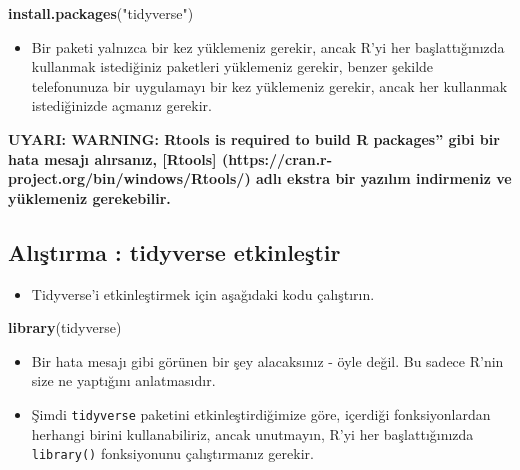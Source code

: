 \documentclass[
  oneside]{book}
\newenvironment{Shaded}{\begin{snugshade}}{\end{snugshade}}
\newcommand{\FunctionTok}[1]{\textcolor[rgb]{0.13,0.29,0.53}{\textbf{#1}}}
\newcommand{\NormalTok}[1]{#1}
\newcommand{\StringTok}[1]{\textcolor[rgb]{0.31,0.60,0.02}{#1}}
\providecommand{\tightlist}{%
  \setlength{\itemsep}{0pt}\setlength{\parskip}{0pt}}
\begin{document}
\begin{Shaded}
\begin{Highlighting}[]
\FunctionTok{install.packages}\NormalTok{(}\StringTok{"tidyverse"}\NormalTok{)}
\end{Highlighting}
\end{Shaded}

\begin{itemize}
\tightlist
\item
  Bir paketi yalnızca bir kez yüklemeniz gerekir, ancak R'yi her başlattığınızda kullanmak istediğiniz paketleri yüklemeniz gerekir, benzer şekilde telefonunuza bir uygulamayı bir kez yüklemeniz gerekir, ancak her kullanmak istediğinizde açmanız gerekir.
\end{itemize}

\begin{info}
\textbf{UYARI: WARNING: Rtools is required to build R packages'' gibi
bir hata mesajı alırsanız, {[}Rtools{]}
(https://cran.r-project.org/bin/windows/Rtools/) adlı ekstra bir yazılım
indirmeniz ve yüklemeniz gerekebilir.}
\end{info}

\hypertarget{alux131ux15ftux131rma-tidyverse-etkinleux15ftir}{%
\subsection{Alıştırma : tidyverse etkinleştir}\label{alux131ux15ftux131rma-tidyverse-etkinleux15ftir}}

\begin{itemize}
\tightlist
\item
  Tidyverse'i etkinleştirmek için aşağıdaki kodu çalıştırın.
\end{itemize}

\begin{Shaded}
\begin{Highlighting}[]
\FunctionTok{library}\NormalTok{(tidyverse)}
\end{Highlighting}
\end{Shaded}

\begin{itemize}
\item
  Bir hata mesajı gibi görünen bir şey alacaksınız - öyle değil. Bu sadece R'nin size ne yaptığını anlatmasıdır.
\item
  Şimdi \texttt{tidyverse} paketini etkinleştirdiğimize göre, içerdiği fonksiyonlardan herhangi birini kullanabiliriz, ancak unutmayın, R'yi her başlattığınızda \texttt{library()} fonksiyonunu çalıştırmanız gerekir.
\end{itemize}
\end{document}
